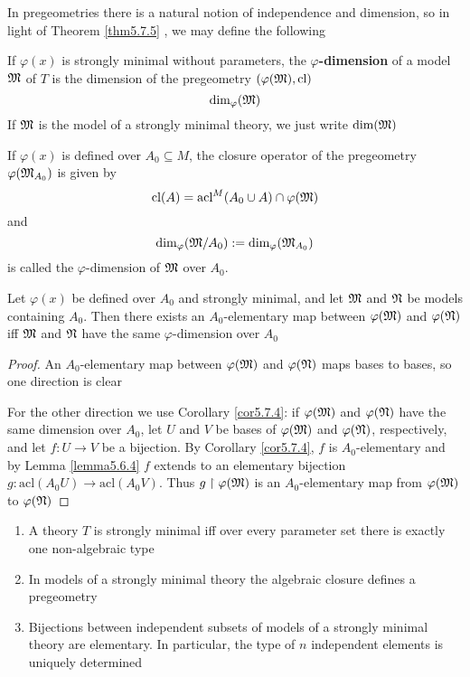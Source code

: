 \documentclass[11pt]{article}
\def \acl {\text{acl}}
\begin{document}
In pregeometries there is a natural notion of independence and dimension, so in light of Theorem
\ref{thm5.7.5} , we may define the following

If \(\varphi(x)\) is strongly minimal without parameters, the \textbf{\(\varphi\)-dimension} of a model \(\mathfrak{M}\)
of \(T\) is the dimension of the pregeometry \((\varphi(\mathfrak{M}),\operatorname{\text{cl}})\)
\begin{equation*}
\dim_\varphi(\mathfrak{M})
\end{equation*}
If \(\mathfrak{M}\) is the model of a strongly minimal theory, we just write \(\dim(\mathfrak{M})\)

If \(\varphi(x)\) is defined over \(A_0\subseteq M\), the closure operator of the pregeometry \(\varphi(\mathfrak{M}_{A_0})\)
is given by
\begin{equation*}
\cl(A)=\acl^M(A_0\cup A)\cap\varphi(\fM)
\end{equation*}
and
\begin{equation*}
\dim_\varphi(\mathfrak{M}/A_0):=\dim_{\varphi}(\mathfrak{M}_{A_0})
\end{equation*}
is called the \(\varphi\)-dimension of \(\mathfrak{M}\) over \(A_0\).

\begin{lemma}[]
Let \(\varphi(x)\) be defined over \(A_0\) and strongly minimal, and let \(\mathfrak{M}\) and \(\mathfrak{N}\) be models
containing \(A_0\). Then there exists an \(A_0\)-elementary map between \(\varphi(\mathfrak{M})\) and \(\varphi(\mathfrak{N})\)
iff \(\mathfrak{M}\) and \(\mathfrak{N}\) have the same \(\varphi\)-dimension over \(A_0\)
\end{lemma}

\begin{proof}
An \(A_0\)-elementary map between \(\varphi(\mathfrak{M})\) and \(\varphi(\mathfrak{N})\) maps bases to bases, so one direction is
clear

For the other direction we use Corollary \ref{cor5.7.4}: if \(\varphi(\mathfrak{M})\) and \(\varphi(\mathfrak{N})\) have the same
dimension over \(A_0\), let \(U\) and \(V\) be bases of \(\varphi(\mathfrak{M})\) and \(\varphi(\mathfrak{N})\), respectively, and
let \(f:U\to V\) be a bijection. By Corollary \ref{cor5.7.4}, \(f\) is \(A_0\)-elementary
and by Lemma \ref{lemma5.6.4} \(f\) extends to an elementary
bijection \(g:\acl(A_0U)\to\acl(A_0V)\). Thus \(g\upharpoonright\varphi(\mathfrak{M})\) is an \(A_0\)-elementary map
from \(\varphi(\mathfrak{M})\) to \(\varphi(\mathfrak{N})\)
\end{proof}

\begin{corollary}[]
\label{cor5.7.7}
\begin{enumerate}
\item A theory \(T\) is strongly minimal iff over every parameter set there is exactly one
non-algebraic type
\item In models of a strongly minimal theory the algebraic closure defines a pregeometry
\item Bijections between independent subsets of models of a strongly minimal theory are elementary.
In particular, the type of \(n\) independent elements is uniquely determined
\end{enumerate}
\end{corollary}
\end{document}
